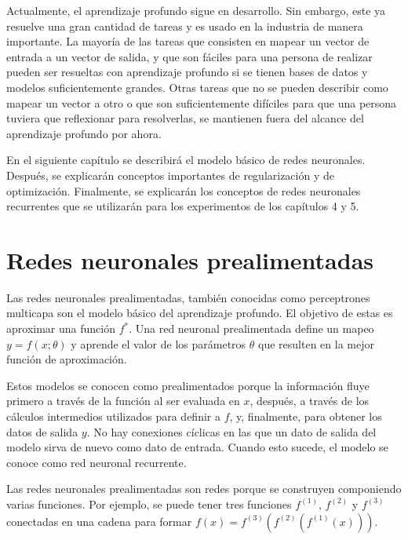 \vspace{1em}

Actualmente, el aprendizaje profundo sigue en desarrollo. Sin embargo, este ya resuelve una gran cantidad de tareas y es usado en la industria de manera importante. La mayoría de las tareas que consisten en mapear un vector de entrada a un vector de salida, y que son fáciles para una persona de realizar pueden ser resueltas con aprendizaje profundo si se tienen bases de datos y modelos suficientemente grandes. Otras tareas que no se pueden describir como mapear un vector a otro o que son suficientemente difíciles para que una persona tuviera que reflexionar para resolverlas, se mantienen fuera del alcance del aprendizaje profundo por ahora.
\cite{goodfellow-et-al-2016}

\vspace{1em}

En el siguiente capítulo se describirá el modelo básico de redes neuronales. Después, se explicarán conceptos importantes de regularización y de optimización. Finalmente, se explicarán los conceptos de redes neuronales recurrentes que se utilizarán para los experimentos de los capítulos 4 y 5.

\section{Redes neuronales prealimentadas}
Las redes neuronales prealimentadas, también conocidas como perceptrones multicapa son el modelo básico del aprendizaje profundo. El objetivo de estas es aproximar una función $f^*$. Una red neuronal prealimentada define un mapeo $y = f(x;\theta)$ y aprende el valor de los parámetros $\theta$ que resulten en la mejor función de aproximación. 

\vspace{1em}

Estos modelos se conocen como prealimentados porque la información fluye primero a través de la función al ser evaluada en $x$, después, a través de los cálculos intermedios utilizados para definir a $f$, y, finalmente, para obtener los datos de salida $y$. No hay conexiones cíclicas en las que un dato de salida del modelo sirva de nuevo como dato de entrada. Cuando esto sucede, el modelo se conoce como red neuronal recurrente.
\cite{goodfellow-et-al-2016}

\vspace{1em}

Las redes neuronales prealimentadas son redes porque se construyen componiendo varias funciones. Por ejemplo, se puede tener tres funciones $f^{(1)}$, $f^{(2)}$ y $f^{(3)}$ conectadas en una cadena para formar $f(x) = f^{(3)}(f^{(2)}(f^{(1)}(x)))$.

